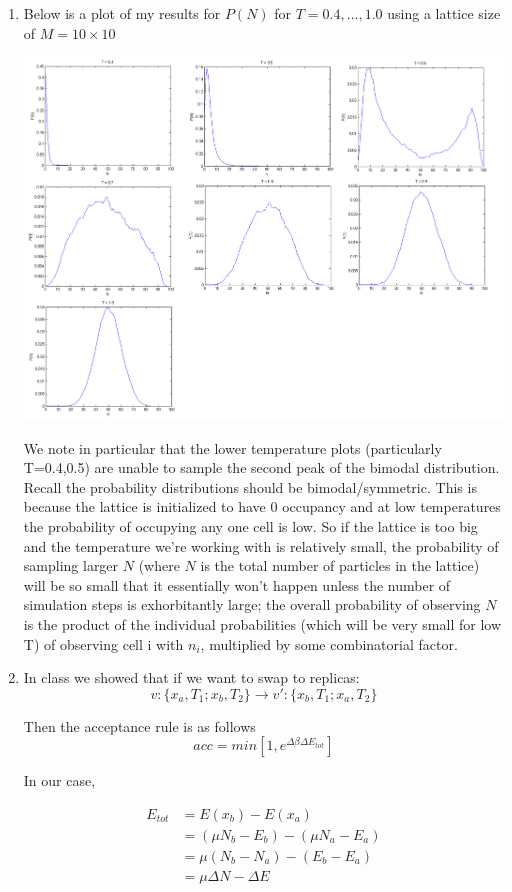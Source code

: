 \documentclass{article}
\begin{document}
\begin{enumerate}
  \item Below is a plot of my results for $P(N)$ for $T = 0.4,...,1.0$ using a lattice size of $M = 10 \times 10$
    \begin{center}
      \includegraphics[scale=0.25]{prob2iv}
    \end{center}

    We note in particular that the lower temperature plots (particularly T=0.4,0.5) are unable to sample the second peak of the bimodal distribution. Recall the probability distributions should be bimodal/symmetric. This is because the lattice is initialized to have 0 occupancy and at low temperatures the probability of occupying any one cell is low. So if the lattice is too big and the temperature we're working with is relatively small, the probability of sampling larger $N$ (where $N$ is the total number of particles in the lattice) will be so small that it essentially won't happen unless the number of simulation steps is exhorbitantly large; the overall probability of observing $N$ is the product of the individual probabilities (which will be very small for low T) of observing cell i with $n_i$, multiplied by some combinatorial factor.

  \item In class we showed that if we want to swap to replicas:
    $$v : \{ x_a, T_1 ; x_b, T_2 \} \rightarrow v' : \{ x_b, T_1 ; x_a, T_2 \}$$

    Then the acceptance rule is as follows
    $$acc = min\left[ 1, e^{\Delta \beta \Delta E_{tot}}\right]$$

    In our case,
    \begin{center}
      \begin{align}    
        E_{tot} &= E(x_b) - E(x_a) \\
        &= (\mu N_b - E_b) - (\mu N_a - E_a) \\
        &= \mu (N_b - N_a) - (E_b - E_a) \\
        &= \mu \Delta N - \Delta E
      \end{align}
    \end{center}


\end{enumerate}
\end{document}
